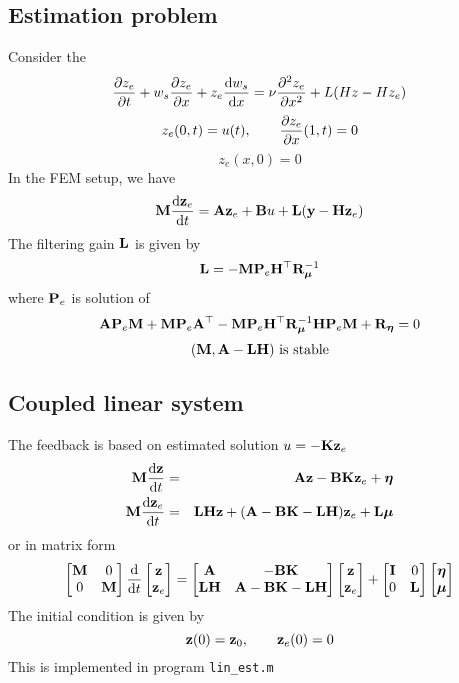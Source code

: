 \documentclass[12pt]{article}
\begin{document}

\subsection{Estimation problem}
Consider the 
\begin{equation}
\df{z_e}{t} + w_s \df{z_e}{x} + z_e \dd{w_s}{x} = \nu \df{^2 z_e}{x^2} + L( H z - H z_e )
\end{equation}
\begin{equation}
z_e(0,t) = u(t), \qquad \df{z_e}{x}(1,t) = 0
\end{equation}
\begin{equation}
z_e(x,0) = 0
\end{equation}
In the FEM setup, we have
\[
\M \dd{\z_e}{t} = \A \z_e + \B u + \bL(\y - \bH \z_e)
\]
The filtering gain $\bL$ is given by 
\[
\bL = - \M \bdP_e \bH^\top \R^{-1}_{\boldsymbol\mu}
\]
where $\bdP_e$ is solution of
\[
\A \bdP_e \M + \M \bdP_e \A^\top - \M \bdP_e \bH^\top \R_{\boldsymbol\mu}^{-1}  \bH \bdP_e \M + \R_{\boldsymbol\eta}  = 0
\]
\[
 (\M,\A - \bL \bH) \text{ is stable} 
\]


\subsection{Coupled linear system}
The feedback is based on estimated solution $u = -\K \z_e$
\begin{eqnarray*}
\M \dd{\z}{t} &=& \A \z - \B \K \z_e + \boldsymbol\eta \\
\M \dd{\z_e}{t} &=& \bL \bH \z + (\A - \B \K - \bL \bH) \z_e + \bL \boldsymbol\mu
\end{eqnarray*}
or in matrix form
\[\begin{bmatrix}
   \M & 0\\
   0 & \M \\
  \end{bmatrix}
\dd{}{t} \begin{bmatrix}
\z \\
\z_e \end{bmatrix} = \begin{bmatrix}
\A & -\B \K \\
\bL \bH & \A - \B \K - \bL \bH \end{bmatrix} \begin{bmatrix}
\z \\ \z_e \end{bmatrix} + \begin{bmatrix}
\I & 0 \\
0 & \bL \end{bmatrix} \begin{bmatrix}
\boldsymbol\eta \\ \boldsymbol\mu \end{bmatrix}
\]
The initial condition is given by
\[
\z(0) = \z_0, \qquad \z_e(0) = 0
\]
This is implemented in program {\tt lin\_est.m}
\end{document}
